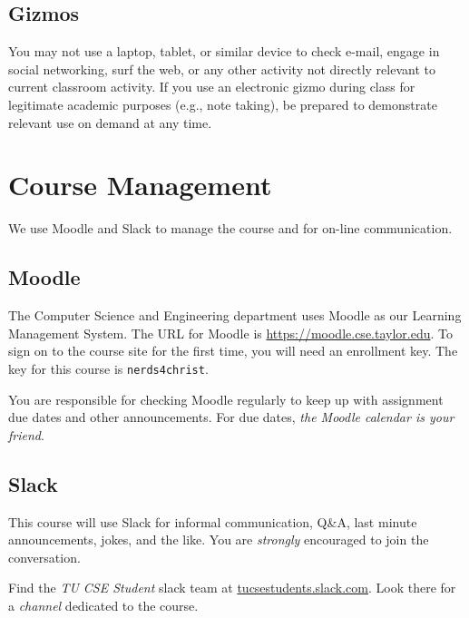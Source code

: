 \subsection{Gizmos}

You may not use a laptop, tablet, or similar device to check e-mail, engage in social
networking, surf the web, or any other activity not directly relevant
to current classroom activity.
If you use an electronic gizmo during class for legitimate academic purposes
(e.g., note taking), be prepared to demonstrate relevant use on demand
at any time.

\section{Course Management}

We use Moodle and Slack to manage the course
and for on-line communication.

\subsection{Moodle}

The Computer Science and Engineering department uses Moodle
as our Learning Management System.
The URL for Moodle is \url{https://moodle.cse.taylor.edu}.
To sign on to the course site for the first time,
you will need an enrollment key.
The key for this course is
\texttt{nerds4christ}.

You are responsible for checking Moodle regularly
to keep up with assignment due dates and other announcements.
For due dates, \emph{the Moodle calendar is your friend}.

\subsection{Slack}

This course will use Slack
for informal communication,
Q\&A,
last minute announcements,
jokes,
and the like.
You are \emph{strongly} encouraged to join the conversation.

Find the \emph{TU CSE Student} slack team at
\url{tucsestudents.slack.com}.
Look there for a \emph{channel}
dedicated to the course.

